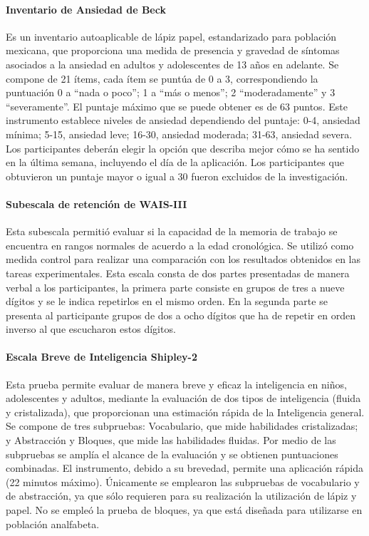 \documentclass[12pt,letterpaper,final]{article}
\let\cite\cite %
\begin{document}
\paragraph[Inventario de Ansiedad de Beck]{Inventario de Ansiedad de Beck \cite{Robles2001}} Es un inventario autoaplicable de lápiz papel,  estandarizado para población mexicana, que proporciona una medida de presencia y gravedad de síntomas asociados a la ansiedad en adultos y adolescentes de 13 años en adelante. Se compone de 21 ítems, cada ítem se puntúa de 0 a 3, correspondiendo la puntuación 0 a “nada o poco”; 1 a “más o menos”; 2 “moderadamente” y 3 “severamente”.  El puntaje máximo que se puede obtener es de 63 puntos. Este instrumento establece niveles de ansiedad dependiendo del puntaje: 0-4, ansiedad mínima; 5-15, ansiedad leve; 16-30, ansiedad moderada; 31-63, ansiedad severa. Los participantes deberán elegir  la opción que describa mejor cómo se ha sentido en la última semana, incluyendo el día de la aplicación. Los participantes que obtuvieron un puntaje mayor o igual a 30 fueron excluidos de la investigación.

\paragraph[Subescala de Retención de WAIS-III ]{Subescala de retención de WAIS-III \cite{WeschlerIII2004}}
Esta subescala permitió evaluar si la capacidad de la memoria de trabajo se encuentra en rangos normales de acuerdo a la edad cronológica. Se utilizó como medida control para realizar una comparación con los resultados obtenidos en las tareas experimentales. Esta escala consta de dos partes presentadas de manera verbal a los participantes, la primera parte consiste en grupos de tres a nueve dígitos y se le indica repetirlos en el mismo orden. En la segunda parte se presenta al participante grupos de dos a ocho dígitos que ha de repetir en orden inverso al que escucharon estos dígitos.


\paragraph[Escala Breve de Inteligencia Shipley-2]{Escala Breve de Inteligencia Shipley-2 \cite{Shipley2014}}
Esta prueba permite evaluar de manera breve y eficaz la inteligencia en niños, adolescentes y adultos, mediante la evaluación de dos tipos de inteligencia (fluida y cristalizada), que proporcionan una estimación rápida de la Inteligencia general.
Se compone de tres subpruebas: Vocabulario, que mide habilidades cristalizadas; y Abstracción y Bloques, que mide las habilidades fluidas. Por medio de las subpruebas se amplía el alcance de la evaluación y se obtienen puntuaciones combinadas. El instrumento, debido a su brevedad, permite una aplicación rápida (22 minutos máximo). Únicamente se emplearon las subpruebas de vocabulario y de abstracción, ya que sólo requieren para su realización la utilización de lápiz y papel. No se empleó la prueba de bloques, ya que está diseñada para utilizarse en población analfabeta.
\end{document}
